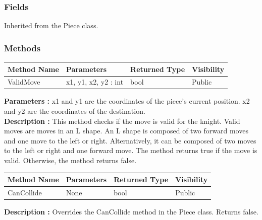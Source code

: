 \documentclass[12pt]{article}
\begin{document}
    \subsubsection{Fields}

    Inherited from the Piece class.

    \subsubsection{Methods}

    \begin{table}[H]
        \begin{tabular}{|l|l|l|l|}
            \hline
            \rowcolor[HTML]{EFEFEF}
            \cellcolor[HTML]{EFEFEF}\textbf{Method Name} & \textbf{Parameters}  & \textbf{Returned Type} & \textbf{Visibility} \\ \hline
            ValidMove                                    & x1, y1, x2, y2 : int & bool                   & Public              \\ \hline
        \end{tabular}
    \end{table}

    \textbf{Parameters :} x1 and y1 are the coordinates of the piece's current position.
    x2 and y2 are the coordinates of the destination.
    \\
    \textbf{Description :} This method checks if the move is valid for the knight.
    Valid moves are moves in an L shape.
    An L shape is composed of two forward moves and one move to the left or right.
    Alternatively, it can be composed of two moves to the left or right and one forward move.
    The method returns true if the move is valid.
    Otherwise, the method returns false.

    \begin{table}[H]
        \begin{tabular}{|l|l|l|l|}
            \hline
            \rowcolor[HTML]{EFEFEF}
            \cellcolor[HTML]{EFEFEF}\textbf{Method Name} & \textbf{Parameters} & \textbf{Returned Type} & \textbf{Visibility} \\ \hline
            CanCollide                                   & None                & bool                   & Public              \\ \hline
        \end{tabular}
    \end{table}

    \textbf{Description :} Overrides the CanCollide method in the Piece class.
    Returns false.
\end{document}

